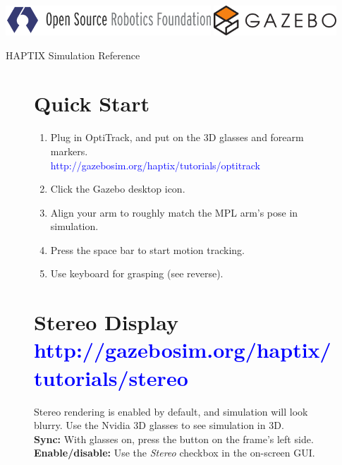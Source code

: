 \documentclass[11pt, letterpaper, landscape]{article}
\begin{document}
\clearpage
\thispagestyle{empty}
\pagestyle{empty}
\small
\includegraphics[height=3.0em]{osrf-pos-horz-pms5265}
\hspace{0.51\textwidth}%
\includegraphics[height=3.0em]{gazebo.pdf}

\begin{center}
{\LARGE HAPTIX Simulation Reference}%
\end{center}

\begin{figure}[!htb]
  \centering
  \begin{minipage}[t]{0.48\textwidth}
    \begin{tcolorbox}[height=6.5cm,colback=gray!8,colframe=gray!15]
      \section*{Quick Start}
      \begin{enumerate}
        \item Plug in OptiTrack, and put on the 3D glasses and forearm markers.\\
          \textcolor{blue}{http://gazebosim.org/haptix/tutorials/optitrack}
        \item Click the Gazebo desktop icon.
        \item Align your arm to roughly match the MPL arm's pose in simulation.
        \item Press the space bar to start motion tracking.
        \item Use keyboard for grasping (see reverse).
      \end{enumerate}
    \end{tcolorbox}
  \end{minipage}%
  \hspace{0.02\textwidth}%
  \begin{minipage}[t]{0.48\textwidth}
    \begin{tcolorbox}[height=6.5cm,colback=gray!8,colframe=gray!15]
      \section*{Stereo Display \textcolor{blue}{\textnormal{\small http://gazebosim.org/haptix/tutorials/stereo}}}
      Stereo rendering is enabled by default, and simulation will look blurry. Use the Nvidia 3D glasses to see simulation in 3D.\\

      {\bf Sync:} With glasses on, press the button on the frame's left side.\\
      \newline
      {\bf Enable/disable:} Use the {\em Stereo} checkbox in the on-screen GUI.\\
    \end{tcolorbox}
  \end{minipage}
\end{figure}
\end{document}
